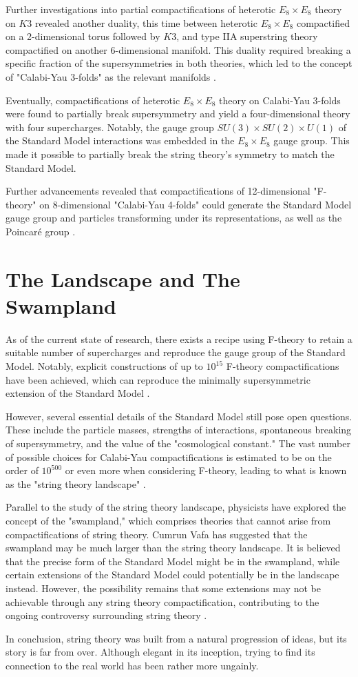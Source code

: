 \documentclass[12pt]{article}
\begin{document}
Further investigations into partial compactifications of heterotic $E_8 \times E_8$ theory on $K3$ revealed another duality, this time between heterotic $E_8 \times E_8$ compactified on a 2-dimensional torus followed by $K3$, and type IIA superstring theory compactified on another 6-dimensional manifold. This duality required breaking a specific fraction of the supersymmetries in both theories, which led to the concept of "Calabi-Yau 3-folds" as the relevant manifolds \cite{Vafa1996}.

Eventually, compactifications of heterotic $E_8 \times E_8$ theory on Calabi-Yau 3-folds were found to partially break supersymmetry and yield a four-dimensional theory with four supercharges. Notably, the gauge group $SU(3) \times SU(2) \times U(1)$ of the Standard Model interactions was embedded in the $E_8 \times E_8$ gauge group. This made it possible to partially break the string theory's symmetry to match the Standard Model.

Further advancements revealed that compactifications of 12-dimensional "F-theory" on 8-dimensional "Calabi-Yau 4-folds" could generate the Standard Model gauge group and particles transforming under its representations, as well as the Poincaré group \cite{Candelas1992, Witten1995}.

\section{The Landscape and The Swampland}

As of the current state of research, there exists a recipe using F-theory to retain a suitable number of supercharges and reproduce the gauge group of the Standard Model. Notably, explicit constructions of up to $10^{15}$ F-theory compactifications have been achieved, which can reproduce the minimally supersymmetric extension of the Standard Model \cite{vafa2005string}.

However, several essential details of the Standard Model still pose open questions. These include the particle masses, strengths of interactions, spontaneous breaking of supersymmetry, and the value of the "cosmological constant." The vast number of possible choices for Calabi-Yau compactifications is estimated to be on the order of $10^{500}$ or even more when considering F-theory, leading to what is known as the "string theory landscape" \cite{vafa2005string}.

Parallel to the study of the string theory landscape, physicists have explored the concept of the "swampland," which comprises theories that cannot arise from compactifications of string theory. Cumrun Vafa has suggested that the swampland may be much larger than the string theory landscape. It is believed that the precise form of the Standard Model might be in the swampland, while certain extensions of the Standard Model could potentially be in the landscape instead. However, the possibility remains that some extensions may not be achievable through any string theory compactification, contributing to the ongoing controversy surrounding string theory \cite{denef2007geometry}.





In conclusion, string theory was built from a natural progression of ideas, but its story is far from over. Although elegant in its inception, trying to find its connection to the real world has been rather more ungainly.


\newpage


 
\end{document}
